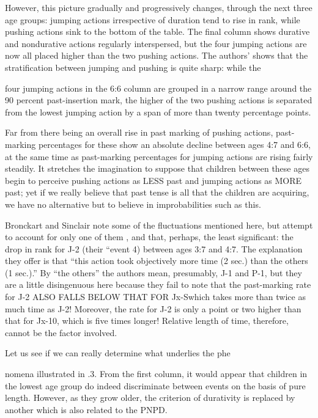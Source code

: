 However, this picture gradually and progressively changes, through the next three age groups: jumping actions irrespective of duration tend to rise in rank, while pushing actions sink to the bottom of the table. The final column shows durative and nondurative actions regularly interspersed, but the four jumping actions are now all placed higher than the two pushing actions. The authors' shows that the stratification between jumping and pushing is quite sharp: while the


four jumping actions in the 6:6 column are grouped in a narrow range around the 90 percent past-insertion mark, the higher of the two push\-ing actions is separated from the lowest jumping action by a span of more than twenty percentage points.

Far from there being an overall rise in past marking of pushing actions, past-marking percentages for these show an absolute decline between ages 4:7 and 6:6, at the same time as past-marking percentages for jumping actions are rising fairly steadily. It stretches the imagina\-tion to suppose that children between these ages begin to perceive pushing actions as LESS past and jumping actions as MORE past; yet if we really believe that past tense is all that the children are ac\-quiring, we have no alternative but to believe in improbabilities such as this.

Bronckart and Sinclair note some of the fluctuations mentioned here, but attempt to account for only one of them , and that, perhaps, the least significant: the drop in rank for J-2 (their ``event 4{\textquotedbl}) be\-tween ages 3:7 and 4:7. The explanation they offer is that ``this action took objectively more time (2 sec.) than the others (1 sec.).'' By ``the others'' the authors mean, presumably, J-1 and P-1, but they are a little disingenuous here because they fail to note that the past-marking rate for J-2 ALSO FALLS BELOW THAT FOR Jx-Swhich takes more than twice as much time as J-2! Moreover, the rate for J-2 is only a point or two higher than that for Jx-10, which is five times longer! Relative length of time, therefore, cannot be the factor involved.

Let us see if we can really determine what underlies the phe\-

nomena illustrated in .3. From the first column, it would appear that children in the lowest age group do indeed discriminate between events on the basis of pure length. However, as they grow older, the criterion of durativity is replaced by another which is also related to the PNPD.

